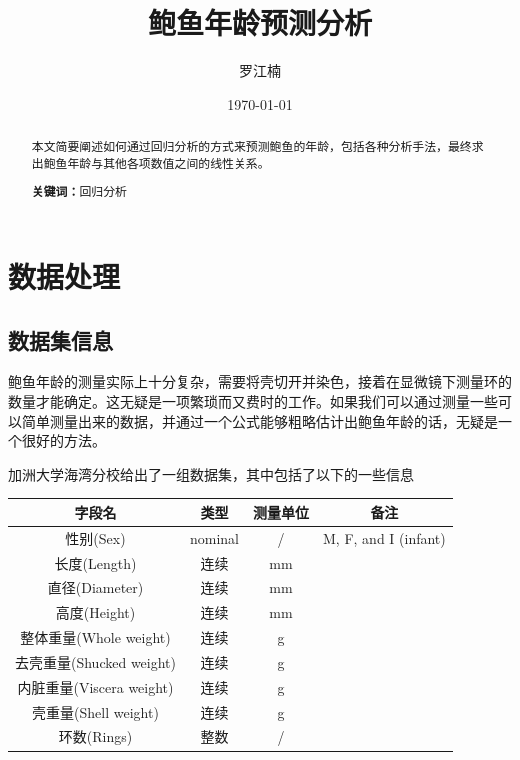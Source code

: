 \documentclass[hyperref,UTF8,12pt,a4paper]{ctexart}
\title{鲍鱼年龄预测分析}
\author{罗江楠}
\date{\today}
\begin{document}
\maketitle

\newpage
\begin{abstract}
\vspace{\baselineskip}
本文简要阐述如何通过回归分析的方式来预测鲍鱼的年龄，包括各种分析手法，最终求出鲍鱼年龄与其他各项数值之间的线性关系。
\par
\textbf{关键词：}回归分析
\end{abstract}

\newpage
\tableofcontents

\newpage
\section{数据处理}

\subsection{数据集信息}

鲍鱼年龄的测量实际上十分复杂，需要将壳切开并染色，接着在显微镜下测量环的数量才能确定。这无疑是一项繁琐而又费时的工作。如果我们可以通过测量一些可以简单测量出来的数据，并通过一个公式能够粗略估计出鲍鱼年龄的话，无疑是一个很好的方法。

加洲大学海湾分校给出了一组数据集，其中包括了以下的一些信息

\begin{center}
  \begin{tabular}{c c c c}
    \hline
    \hline
    \textbf{字段名} & \textbf{类型} & \textbf{测量单位} & \textbf{备注} \\
    \hline
    性别(Sex) & nominal & / & M, F, and I (infant) \\
    长度(Length) & 连续 & mm & \\
    直径(Diameter) & 连续 & mm & \\
    高度(Height) & 连续 & mm & \\
    整体重量(Whole weight) & 连续 & g & \\
    去壳重量(Shucked weight) & 连续 & g & \\
    内脏重量(Viscera weight) & 连续 & g & \\
    壳重量(Shell weight) & 连续 & g & \\
    环数(Rings) & 整数 & / & \\
    \hline
    \hline
  \end{tabular}
\end{center}
\end{document}
